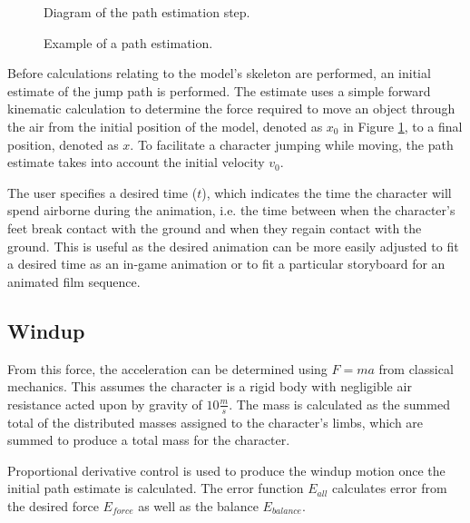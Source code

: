 \begin{figure}[ht]
	\centering
	
	\caption[Diagram of path estimation algorithm]{Diagram of the path estimation step.}
	\label{fig:pathEstimate}
\end{figure}

\begin{figure}[ht]
	\label{fig:pathExample}
	\caption[Example of estimated path]{Example of a path estimation.}
\end{figure}
Before calculations relating to the model's skeleton are performed, an initial estimate of the jump path is performed.  The estimate uses a simple forward kinematic calculation to determine the force required to move an object through the air from the initial position of the model, denoted as $x_0$ in Figure \ref{fig:pathEstimate}, to a final position, denoted as $x$.  To facilitate a character jumping while moving, the path estimate takes into account the initial velocity $v_0$.

The user specifies a desired time ($t$), which indicates the time the character will spend airborne during the animation, i.e. the time between when the character's feet break contact with the ground and when they regain contact with the ground.  This is useful as the desired animation can be more easily adjusted to fit a desired time as an in-game animation or to fit a particular storyboard for an animated film sequence.

\subsection{Windup}
From this force, the acceleration can be determined using $F=ma$ from classical mechanics.  This assumes the character is a rigid body with negligible air resistance acted upon by gravity of $10\frac{m}{s}$.  The mass is calculated as the summed total of the distributed masses assigned to the character's limbs, which are summed to produce a total mass for the character.

Proportional derivative control is used to produce the windup motion once the initial path estimate is calculated.  The error function $E_{all}$ calculates error from the desired force $E_{force}$ as well as the balance $E_{balance}$.

